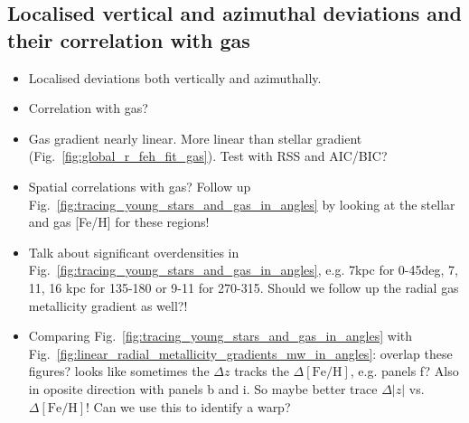 \documentclass[fleqn,usenatbib]{mnras}
\begin{document}
\subsection{Localised vertical and azimuthal deviations and their correlation with gas} \label{sec:discussion_coherence_position}





\begin{itemize}
    \item Localised deviations both vertically and azimuthally.
    \item Correlation with gas?
    \item Gas gradient nearly linear. More linear than stellar gradient (Fig.~\ref{fig:global_r_feh_fit_gas}). Test with RSS and AIC/BIC?
    \item Spatial correlations with gas? Follow up Fig.~\ref{fig:tracing_young_stars_and_gas_in_angles} by looking at the stellar and gas [Fe/H] for these regions!
    \item Talk about significant overdensities in Fig.~\ref{fig:tracing_young_stars_and_gas_in_angles}, e.g. 7kpc for 0-45deg, 7, 11, 16 kpc for 135-180 or 9-11 for 270-315. Should we follow up the radial gas metallicity gradient as well?!
    \item Comparing Fig.~\ref{fig:tracing_young_stars_and_gas_in_angles} with Fig.~\ref{fig:linear_radial_metallicity_gradients_mw_in_angles}: overlap these figures? looks like sometimes the $\Delta z$ tracks the $\Delta\mathrm{[Fe/H]}$, e.g. panels f? Also in oposite direction with panels b and i. So maybe better trace $\Delta \vert z \vert$ vs. $\Delta \mathrm{[Fe/H]}$! Can we use this to identify a warp?
\end{itemize}
\end{document}

